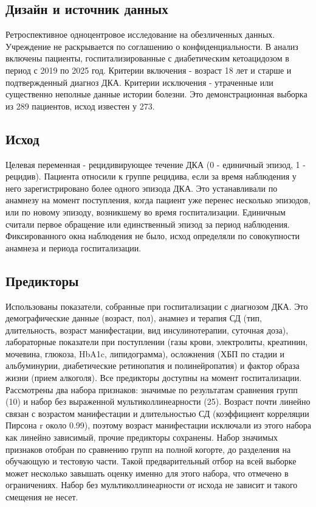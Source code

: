 \documentclass[12pt,a4paper]{article}
\begin{document}
\subsection{Дизайн и источник данных}

Ретроспективное одноцентровое исследование на обезличенных данных. Учреждение не
раскрывается по соглашению о конфиденциальности. В анализ включены пациенты,
госпитализированные с диабетическим кетоацидозом в период с 2019 по 2025 год. Критерии
включения - возраст 18 лет и старше и подтвержденный диагноз ДКА. Критерии исключения -
утраченные или существенно неполные данные истории болезни. Это демонстрационная выборка
из 289 пациентов, исход известен у 273.

\subsection{Исход}

Целевая переменная - рецидивирующее течение ДКА (0 - единичный эпизод, 1 - рецидив).
Пациента относили к группе рецидива, если за время наблюдения у него зарегистрировано
более одного эпизода ДКА. Это устанавливали по анамнезу на момент поступления, когда
пациент уже перенес несколько эпизодов, или по новому эпизоду, возникшему во время
госпитализации. Единичным считали первое обращение или единственный эпизод за период
наблюдения. Фиксированного окна наблюдения не было, исход определяли по совокупности
анамнеза и периода госпитализации.

\subsection{Предикторы}

Использованы показатели, собранные при госпитализации с диагнозом ДКА. Это демографические
данные (возраст, пол), анамнез и терапия СД (тип, длительность, возраст манифестации, вид
инсулинотерапии, суточная доза), лабораторные показатели при поступлении (газы крови,
электролиты, креатинин, мочевина, глюкоза, HbA1c, липидограмма), осложнения (ХБП по стадии
и альбуминурии, диабетические ретинопатия и полинейропатия) и фактор образа жизни (прием
алкоголя). Все предикторы доступны на момент госпитализации. Рассмотрены два набора
признаков: значимые по результатам сравнения групп (10) и набор без выраженной
мультиколлинеарности (25). Возраст почти линейно связан с возрастом манифестации и
длительностью СД (коэффициент корреляции Пирсона r около 0.99), поэтому возраст
манифестации исключали из этого набора как линейно зависимый, прочие предикторы сохранены.
Набор значимых признаков отобран по сравнению групп на полной когорте, до разделения на
обучающую и тестовую части. Такой предварительный отбор на всей выборке может несколько
завышать оценку именно для этого набора, что отмечено в ограничениях. Набор без мультиколлинеарности от исхода не зависит и такого смещения не
несет.
\end{document}
